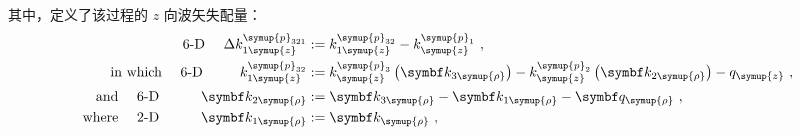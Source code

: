 其中，定义了该过程的 $z$ 向波矢失配量：
\begin{subequations} \label{eq:2-245}
	\abovedisplayskip=13pt
	\belowdisplayskip=13pt
	\begin{align}
		\text{6-D}\ \ \ \ \Delta k^{\symup{p}_{321}}_{1\symup{z}} &:= k^{\symup{p}_{32}}_{1\symup{z}} - k^{\symup{p}_{1}}_{\symup{z}} \label{eq:2-245a}~, \\ \text{in which}\ \ \ \ \text{6-D} \ \ \ \ \ \ \ \ k^{\symup{p}_{32}}_{1\symup{z}} &:= k^{\symup{p}_{3}}_{\symup{z}} \left( \symbf k_{3\symup{\rho}} \right) - k^{\symup{p}_{2}}_{\symup{z}} \left( \symbf k_{2\symup{\rho}} \right) - q_{\symup{z}} \label{eq:2-245b}~, \\ \text{and}\ \ \ \ \text{6-D}\ \ \ \ \ \ \ \ \ \symbf k_{2\symup{\rho}} &:= \symbf k_{3\symup{\rho}} - \symbf k_{1\symup{\rho}} - \symbf q_{\symup{\rho}} \label{eq:2-245c}~, \\ \text{where}\ \ \ \ \text{2-D}\ \ \ \ \ \ \ \ \ \symbf k_{1\symup{\rho}} &:= \symbf k_{\symup{\rho}} \label{eq:2-245d}~,
	\end{align}
\end{subequations}

